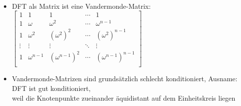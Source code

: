 \begin{frame}{\insertsection}
	\framesubtitle{\insertsubsection}
	\begin{itemize}
		\item DFT als Matrix ist eine Vandermonde-Matrix: \\ \vspace{0.5em}
		$\begin{bmatrix}
			1 & 1 & 1 & \cdots & 1 \\
			1 & \omega & \omega^2 & \cdots & \omega^{n-1} \\
			1 & \omega^2 & (\omega^2)^2 & \cdots & (\omega^2)^{n-1} \\
			\vdots & \vdots & \vdots & \ddots & \vdots \\
			1 & \omega^{n-1} & (\omega^{n-1})^2 & \cdots & (\omega^{n-1})^{n-1} \\
		\end{bmatrix} $ \vspace{0.5em}
		\item Vandermonde-Matrizen sind grundsätzlich schlecht konditioniert,
		Ausname: DFT ist gut konditioniert, \\
		weil die Knotenpunkte zueinander äquidistant auf dem Einheitskreis liegen
	\end{itemize}
\end{frame}


